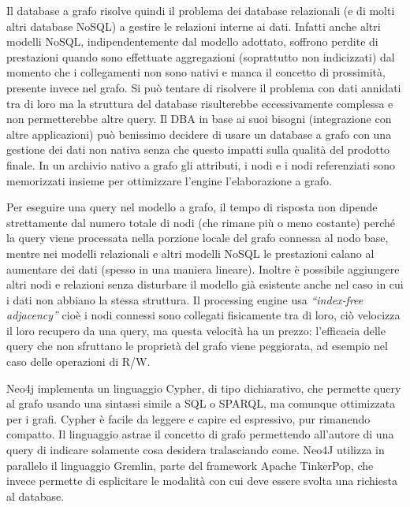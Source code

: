 \documentclass[a4page, 11pt]{article}
\begin{document}
Il database a grafo risolve quindi il problema dei database relazionali (e di molti altri database NoSQL) a gestire le relazioni interne ai dati.
Infatti anche altri modelli NoSQL, indipendentemente dal modello adottato, soffrono perdite di prestazioni quando sono effettuate aggregazioni (soprattutto non indicizzati) dal momento che i collegamenti non sono nativi e manca il concetto di prossimità, presente invece nel grafo.
Si può tentare di risolvere il problema con dati annidati tra di loro ma la struttura del database risulterebbe eccessivamente complessa e non permetterebbe altre query.
Il DBA in base ai suoi bisogni (integrazione con altre applicazioni) può benissimo decidere di usare un database a grafo con una gestione dei dati non nativa senza che questo impatti sulla qualità del prodotto finale.
In un archivio nativo a grafo gli attributi, i nodi e i nodi referenziati sono memorizzati insieme per ottimizzare l'engine l'elaborazione a grafo.

Per eseguire una query nel modello a grafo, il tempo di risposta non dipende strettamente dal numero totale di nodi (che rimane più o meno costante) perché la query viene processata nella porzione locale del grafo connessa al nodo base, mentre nei modelli relazionali e altri modelli NoSQL le prestazioni calano al aumentare dei dati (spesso in una maniera lineare).
Inoltre è possibile aggiungere altri nodi e relazioni senza disturbare il modello già esistente anche nel caso in cui i dati non abbiano la stessa struttura.
Il processing engine usa \textit{``index-free adjacency''} cioè i nodi connessi sono collegati fisicamente tra di loro, ciò velocizza il loro recupero da una query, ma questa velocità ha un prezzo: l'efficacia delle query che non sfruttano le proprietà del grafo viene peggiorata, ad esempio nel caso delle operazioni di R/W.   

Neo4j implementa un linguaggio Cypher, di tipo dichiarativo, che permette query al grafo usando una sintassi simile a SQL o SPARQL, ma comunque ottimizzata per i grafi.
Cypher è facile da leggere e capire ed espressivo, pur rimanendo compatto.
Il linguaggio astrae il concetto di grafo permettendo all'autore di una query di indicare solamente cosa desidera tralasciando come. \newline
Neo4J utilizza in parallelo il linguaggio Gremlin, parte del framework Apache TinkerPop, che invece permette di esplicitare le modalità con cui deve essere svolta una richiesta al database.
\end{document}
